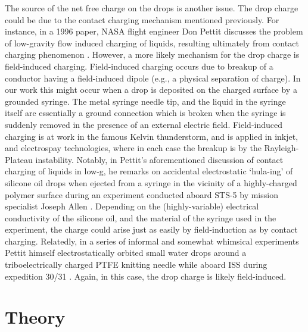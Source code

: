 \documentclass[aip,reprint, floatfix]{revtex4-1}
\begin{document}
The source of the net free charge on the drops is another issue. The drop charge could be due to the contact charging mechanism mentioned previously. For instance, in a 1996 paper, NASA flight engineer Don Pettit discusses the problem of low-gravity flow induced charging of liquids, resulting ultimately from contact charging phenomenon \cite{pettit_donald_flow_????}. However, a more likely mechanism for the drop charge is field-induced charging. Field-induced charging occurs due to breakup of a conductor having a field-induced dipole (e.g., a physical separation of charge). In our work this might occur when a drop is deposited on the charged surface by a grounded syringe. The metal syringe needle tip, and the liquid in the syringe itself are essentially a ground connection which is broken when the syringe is suddenly removed in the presence of an external electric field. Field-induced charging is at work in the famous Kelvin thunderstorm, and is applied in inkjet, and electrospay technologies, where in each case the breakup is by the Rayleigh-Plateau instability. Notably, in Pettit's aforementioned discussion of contact charging of liquids in low-g, he remarks on accidental electrostatic `hula-ing' of silicone oil drops when ejected from a syringe in the vicinity of a highly-charged polymer surface during an experiment conducted aboard STS-5 by mission specialist Joseph Allen \cite{pettit_donald_flow_????}. Depending on the (highly-variable) electrical conductivity of the silicone oil, and the material of the syringe used in the experiment, the charge could arise just as easily by field-induction as by contact charging. Relatedly, in a series of informal and somewhat whimsical experiments Pettit himself electrostatically orbited small water drops around a triboelectrically charged PTFE knitting needle while aboard ISS during expedition 30/31 \cite{stevenson_electrostatic_2015}. Again, in this case, the drop charge is likely field-induced.

\section{Theory}
\end{document}

